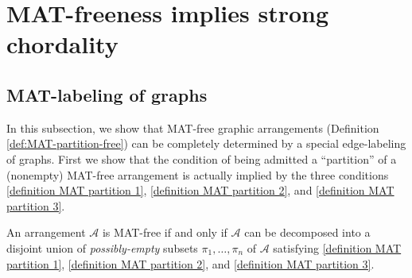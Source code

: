 \section{MAT-freeness implies strong chordality}
\subsection{MAT-labeling of graphs}
\label{subsec:MAT-labeling of graphs}
 
In this subsection, we show that MAT-free graphic arrangements (Definition \ref{def:MAT-partition-free}) can be completely determined by a  special edge-labeling of graphs. 
First we show that the condition of being admitted a ``partition'' of a (nonempty) MAT-free arrangement is actually implied by the three conditions \ref{definition MAT partition 1}, \ref{definition MAT partition 2}, and \ref{definition MAT partition 3}. 
\begin{proposition}\label{no internal empty block}
An arrangement $ \mathcal{A} $ is MAT-free if and only if $ \mathcal{A} $ can be decomposed into a disjoint union of \emph{possibly-empty} subsets $ \pi_{1}, \dots, \pi_{n} $ of $ \mathcal{A} $ satisfying \ref{definition MAT partition 1}, \ref{definition MAT partition 2}, and \ref{definition MAT partition 3}. 
\end{proposition}
